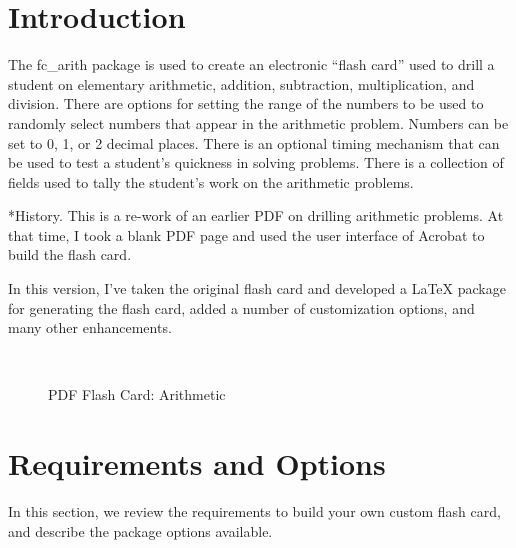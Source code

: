 \documentclass{article}
\makeatletter
\newcommand{\prodName}{\textsf{PDF Flash Card}}
\renewcommand{\paragraph}{\@startsection{paragraph}{4}{0pt}{6pt}{-3pt}{\bfseries}}
\makeatother
\begin{document}
\maketitle



\tableofcontents



\section{Introduction}

The \textsf{fc\_arith} package is used to create an electronic ``flash card'' used to drill a student on elementary arithmetic, addition, subtraction, multiplication, and division. There are options for setting the range of the numbers to be used to randomly select numbers that appear in the arithmetic problem. Numbers can be set to 0, 1, or 2 decimal places. There is an optional timing mechanism that can be used to test a student's quickness in solving problems. There is a collection of fields used to tally the student's work on the arithmetic problems.

\paragraph*{History.} This is a re-work of an earlier PDF on drilling arithmetic problems. At that time, I took a blank PDF page and used the user interface of Acrobat to build the flash card.

In this version, I've taken the original flash card and developed a {\LaTeX} package for generating the flash card, added a number of customization options, and many other enhancements.

\begin{figure}[htb]
\begin{center}\setlength{\fboxsep}{0pt}
\\
\caption{\prodName: Arithmetic}\label{fcaritha}
\end{center}
\end{figure}

\section{Requirements and Options}

In this section, we review the requirements to build your own custom
flash card, and describe the package options available.
\end{document}
